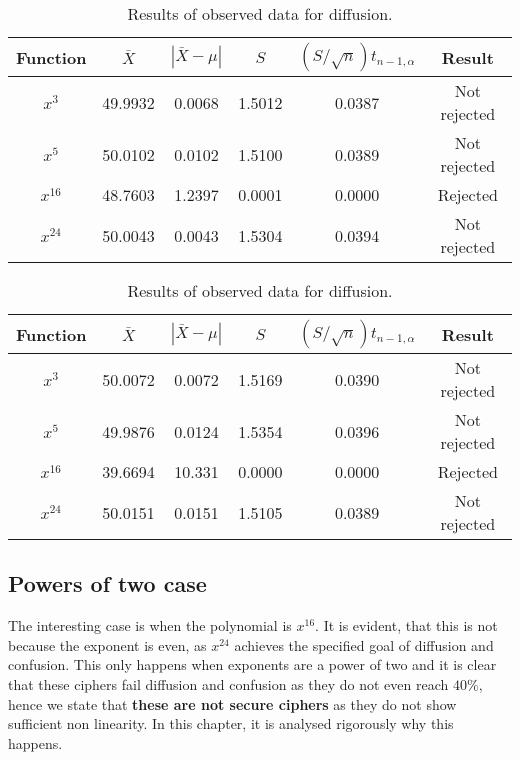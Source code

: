 \documentclass{Resources/UoBLab1}
\theoremstyle{definition}
\begin{document}
\begin{table}[H]
    \centering
    \begin{tabular}{|c|c|c|c|c|c|}
        \hline
        Function & $\bar{X}$ & $|\bar{X} - \mu|$ & $S$ &  $(S/\sqrt{n})t_{n-1,\alpha}$ & Result \\
        \hline
        $x^3$ & 49.9932 & 0.0068 & 1.5012 & 0.0387 & Not rejected \\
        $x^5$ & 50.0102 & 0.0102 & 1.5100 & 0.0389 & Not rejected \\
        $x^{16}$ & 48.7603 & 1.2397 & 0.0001 & 0.0000 & Rejected \\
        $x^{24}$ & 50.0043 & 0.0043 & 1.5304 &  0.0394 & Not rejected \\
        \hline
    \end{tabular}
    \caption{Results of observed data for confusion.}\label{tab:hypothesis-testing-conf}
    \centering
    \begin{tabular}{|c|c|c|c|c|c|}
        \hline
        Function & $\bar{X}$ & $|\bar{X} - \mu|$ & $S$ & $(S/\sqrt{n})t_{n-1,\alpha}$ & Result \\
        \hline
        $x^3$ & 50.0072 & 0.0072 & 1.5169 & 0.0390 & Not rejected \\
        $x^5$ & 49.9876 & 0.0124 & 1.5354 & 0.0396 & Not rejected \\
        $x^{16}$ & 39.6694 & 10.331 & 0.0000 & 0.0000 & Rejected \\
        $x^{24}$ & 50.0151 & 0.0151 & 1.5105 & 0.0389 & Not rejected \\
        \hline
    \end{tabular}
    \caption{Results of observed data for diffusion.}\label{tab:hypothesis-testing-dif}
\end{table}


\subsection{Powers of two case}\label{sub:powers-of-two}
The interesting case is when the polynomial is $x^{16}$. It is evident, that this is not because the exponent is even, as $x^{24}$ achieves the specified goal of diffusion and confusion. This only happens when exponents are a power of two and it is clear that these ciphers fail diffusion and confusion as they do not even reach $40\%$, hence we state that \textbf{these are not secure ciphers} as they do not show sufficient non linearity. In this chapter, it is analysed rigorously why this happens.
\end{document}
